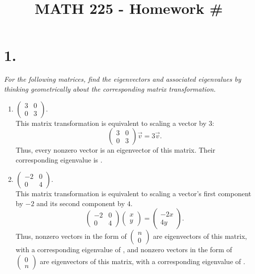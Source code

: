 \documentclass[12pt]{article}
\title{\vspace{-2\baselineskip}MATH 225 - Homework \#\HOMEWORKNUM}
\author{\NAME}
\date{\DATE}
\begin{document}
\maketitle

\section*{1.}
\textit{For the following matrices, find the eigenvectors and associated
eigenvalues by thinking geometrically about the corresponding matrix
transformation.} \\[\baselineskip]
\begin{enumerate}[label=(\alph*)]
	\item $\begin{pmatrix} 3 & 0 \\ 0 & 3 \end{pmatrix}$. \\[\baselineskip]
	This matrix transformation is equivalent to scaling a vector by $3$:
	\begin{equation*}
		\begin{pmatrix} 3 & 0 \\ 0 & 3 \end{pmatrix}
		\vec{v}
		=
		3 \vec{v}
		.
	\end{equation*}
	Thus, every nonzero vector is an eigenvector of this matrix. Their
	corresponding eigenvalue is .
	
	\item $\begin{pmatrix} -2 & 0 \\ 0 & 4 \end{pmatrix}$. \\[\baselineskip]
	This matrix transformation is equivalent to scaling a vector's first
	component by $-2$ and its second component by $4$.
	\begin{equation*}
		\begin{pmatrix} -2 & 0 \\ 0 & 4 \end{pmatrix}
		\begin{pmatrix} x \\ y \end{pmatrix}
		=
		\begin{pmatrix} -2x \\ 4y \end{pmatrix}
		.
	\end{equation*}
	Thus, nonzero vectors in the form of
	$\begin{pmatrix} n \\ 0 \end{pmatrix}$ are eigenvectors of this matrix,
	with a corresponding eigenvalue of , and nonzero vectors in the
	form of $\begin{pmatrix} 0 \\ n \end{pmatrix}$ are eigenvectors of this
	matrix, with a corresponding eigenvalue of .
	

\end{enumerate}
\end{document}
